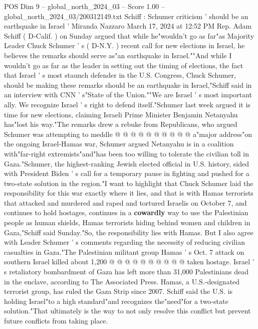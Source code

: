 \begin{textsample}{POS Dim 9 – global\_north\_2024\_03 – Score 1.00 – global\_north\_2024\_03/200312149.txt}  \label{ex:f9_pos_272}
Schiff : Schumer criticism ' should be an earthquake in Israel ' Miranda Nazzaro March 17, 2024 at 12:52 PM Rep.
Adam Schiff ( D-Calif. ) on Sunday argued that while he"wouldn't go as far"as Majority Leader Chuck Schumer ' s ( D-N.Y. ) recent call for new elections in Israel, he believes the remarks should serve as"an earthquake in Israel.""And while I wouldn't go as far as the leader in setting out the timing of elections, the fact that Israel ' s most staunch defender in the U.S.
Congress, Chuck Schumer, should be making these remarks should be an earthquake in Israel,"Schiff said in an interview with CNN ' s"State of the Union.""We are Israel ' s most important ally.
We recognize Israel ' s right to defend itself."Schumer last week argued it is time for new elections, claiming Israeli Prime Minister Benjamin Netanyahu has"lost his way."The remarks drew a rebuke from Republicans, who argued Schumer was attempting to meddle @ @ @ @ @ @ @ @ @ @ a"major address"on the ongoing Israel-Hamas war, Schumer argued Netanyahu is in a coalition with"far-right extremists"and"has been too willing to tolerate the civilian toll in Gaza."Schumer, the highest-ranking Jewish elected official in U.S. history, sided with President Biden ' s call for a temporary pause in fighting and pushed for a two-state solution in the region."I want to highlight that Chuck Schumer laid the responsibility for this war exactly where it lies, and that is with Hamas terrorists that attacked and murdered and raped and tortured Israelis on October 7, and continues to hold hostages, continues in a \textbf{cowardly} way to use the Palestinian people as human shields, Hamas terrorists hiding behind women and children in Gaza,"Schiff said Sunday."So, the responsibility lies with Hamas.
But I also agree with Leader Schumer ' s comments regarding the necessity of reducing civilian casualties in Gaza."The Palestinian militant group Hamas ' s Oct. 7 attack on southern Israel killed about 1,200 @ @ @ @ @ @ @ @ @ @ taken hostage.
Israel ' s retaliatory bombardment of Gaza has left more than 31,000 Palestinians dead in the enclave, according to The Associated Press.
Hamas, a U.S.-designated terrorist group, has ruled the Gaza Strip since 2007.
Schiff said the U.S. is holding Israel"to a high standard"and recognizes the"need"for a two-state solution."That ultimately is the way to not only resolve this conflict but prevent future conflicts from taking place.

\end{textsample}

